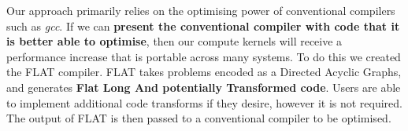 Our approach primarily relies on the optimising power of conventional compilers such as \textit{gcc}.
If we can \textbf{present the conventional compiler with code that it is better able to optimise}, then our compute kernels will receive a performance increase that is portable across many systems. 
To do this we created the FLAT compiler.
FLAT takes problems encoded as a Directed Acyclic Graphs, and generates \textbf{Flat Long And potentially Transformed code}.
Users are able to implement additional code transforms if they desire, however it is not required.
The output of FLAT is then passed to a conventional compiler to be optimised.
